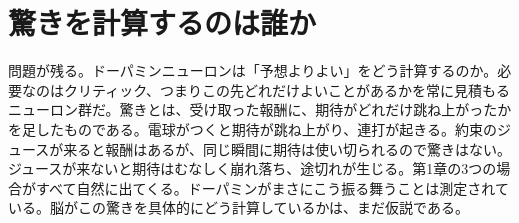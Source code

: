 \section*{驚きを計算するのは誰か}

問題が残る。ドーパミンニューロンは「予想よりよい」をどう計算するのか。必要なのはクリティック、つまりこの先どれだけよいことがあるかを常に見積もるニューロン群だ。驚きとは、受け取った報酬に、期待がどれだけ跳ね上がったかを足したものである。電球がつくと期待が跳ね上がり、連打が起きる。約束のジュースが来ると報酬はあるが、同じ瞬間に期待は使い切られるので驚きはない。ジュースが来ないと期待はむなしく崩れ落ち、途切れが生じる。第1章の3つの場合がすべて自然に出てくる。ドーパミンがまさにこう振る舞うことは測定されている。脳がこの驚きを具体的にどう計算しているかは、まだ仮説である。

